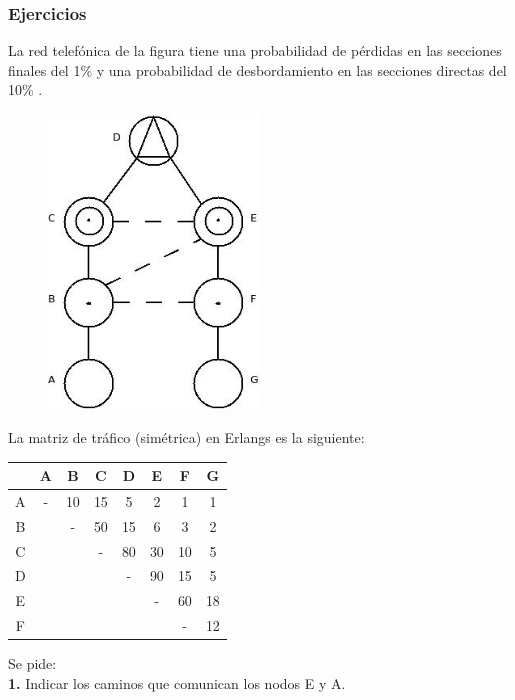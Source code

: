 \subsubsection{Ejercicios}
\begin{exercise}[5]
La red telefónica de la figura tiene una probabilidad de pérdidas en las secciones finales del 1\% y una probabilidad de desbordamiento en las secciones directas del 10\% .
\begin{figure}[H]
\centering
\includegraphics[width=0.5\textwidth]{Imagen/ejercicio5tema1.jpg}
\label{}
\end{figure}
La matriz de tráfico (simétrica) en Erlangs es la siguiente:
\begin{center}
\begin{tabular}{| c | c | c | c | c | c | c | c |}
\hline
   & A & B & C & D & E & F & G \\\hline
 A & - & 10 & 15 & 5 & 2 & 1 & 1 \\\hline
 B &   & - & 50 & 15 & 6 & 3 & 2 \\\hline
 C &   &   & - & 80 & 30 & 10 & 5 \\\hline
 D &   &   &   & - & 90 & 15 & 5 \\\hline
 E &   &   &   &   & - & 60 & 18 \\\hline
 F &   &   &   &   &   & - & 12 \\\hline
\end{tabular}
\end{center}
Se pide:\\
\textbf{1.} Indicar los caminos que comunican los nodos E y A.\\
\begin{center}
\begin{tabular}{c c c c}

\end{tabular}
\end{center}
\end{exercise}
